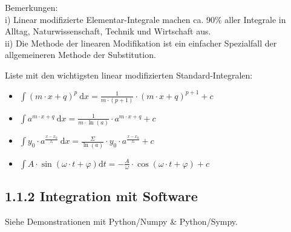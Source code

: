 \documentclass[10pt]{article}
\begin{document}
Bemerkungen:\\
i) Linear modifizierte Elementar-Integrale machen ca. 90\% aller Integrale in Alltag, Naturwissenschaft, Technik und Wirtschaft aus.\\
ii) Die Methode der linearen Modifikation ist ein einfacher Spezialfall der allgemeineren Methode der Substitution.

Liste mit den wichtigsten linear modifizierten Standard-Integralen:

\begin{itemize}
  \item $\int(m \cdot x+q)^{p} \mathrm{~d} x=\frac{1}{m \cdot(p+1)} \cdot(m \cdot x+q)^{p+1}+c$
  \item $\int a^{m \cdot x+q} \mathrm{~d} x=\frac{1}{m \cdot \ln (a)} \cdot a^{m \cdot x+q}+c$
  \item $\int y_{0} \cdot a^{\frac{x-x_{0}}{\Sigma}} \mathrm{~d} x=\frac{\Sigma}{\ln (a)} \cdot y_{0} \cdot a^{\frac{x-x_{0}}{\Sigma}}+c$
  \item $\int A \cdot \sin (\omega \cdot t+\varphi) \mathrm{d} t=-\frac{A}{\omega} \cdot \cos (\omega \cdot t+\varphi)+c$
\end{itemize}

\subsection*{1.1.2 Integration mit Software}
Siehe Demonstrationen mit Python/Numpy \& Python/Sympy.
\end{document}
